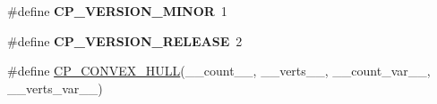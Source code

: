 \begin{DoxyCompactItemize}
\item 
\hypertarget{group__misc_ga015d989acd6a013e84ea8696953172a8}{\#define {\bfseries C\-P\-\_\-\-V\-E\-R\-S\-I\-O\-N\-\_\-\-M\-I\-N\-O\-R}~1}\label{group__misc_ga015d989acd6a013e84ea8696953172a8}

\item 
\hypertarget{group__misc_ga0311c28764c81d74c3c76570bb92c57f}{\#define {\bfseries C\-P\-\_\-\-V\-E\-R\-S\-I\-O\-N\-\_\-\-R\-E\-L\-E\-A\-S\-E}~2}\label{group__misc_ga0311c28764c81d74c3c76570bb92c57f}

\item 
\#define \hyperlink{group__misc_ga9abe29a1fe6d1f2041e95f2fb2e2ce1c}{C\-P\-\_\-\-C\-O\-N\-V\-E\-X\-\_\-\-H\-U\-L\-L}(\-\_\-\-\_\-count\-\_\-\-\_\-, \-\_\-\-\_\-verts\-\_\-\-\_\-, \-\_\-\-\_\-count\-\_\-var\-\_\-\-\_\-, \-\_\-\-\_\-verts\-\_\-var\-\_\-\-\_\-)
\end{DoxyCompactItemize}
